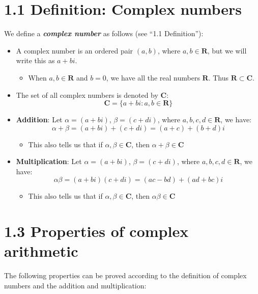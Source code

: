 \documentclass[12pt, letterpaper, oneside]{book}
\begin{document}
\section{1.1 Definition: Complex numbers}

We {define} a \textbf{\emph{complex number}} as follows (see
``1.1 Definition''):

\begin{itemize}
  \item A complex number is an ordered pair $(a, b)$, where $a, b \in
    \mathbf{R}$, but we will write this as $a + bi$.
    \begin{itemize}
      \item When $a, b \in \mathbf{R}$ and $b = 0$, we have all the real
        numbers $\mathbf{R}$. Thus $\mathbf{R} \subset \mathbf{C}$.
    \end{itemize}
  \item The set of all complex numbers is denoted by $\mathbf{C}$:
    \[ \mathbf{C} = \{a + bi: a, b \in \mathbf{R}\} \]
  \item \textbf{Addition}: Let $\alpha = (a + bi)$, $\beta = (c + di)$, where
    $a, b, c, d \in \mathbf{R}$, we have:
    \[ \alpha + \beta = (a + bi) + (c + di) = (a + c) + (b + d)i \]
    \begin{itemize}
      \item This also tells us that if $\alpha, \beta \in \mathbf{C}$, then
        $\alpha + \beta \in \mathbf{C}$
    \end{itemize}
  \item \textbf{Multiplication}: Let $\alpha = (a + bi)$, $\beta = (c + di)$,
    where $a, b, c, d \in \mathbf{R}$, we have:
    \[ \alpha\beta = (a + bi)(c + di) = (ac - bd) + (ad + bc)i \]
    \begin{itemize}
      \item This also tells us that if $\alpha, \beta \in \mathbf{C}$, then
        $\alpha\beta \in \mathbf{C}$
    \end{itemize}
\end{itemize}

\section{1.3 Properties of complex arithmetic}

The following properties can be proved according to the definition of complex
numbers and the addition and multiplication:
\end{document}
